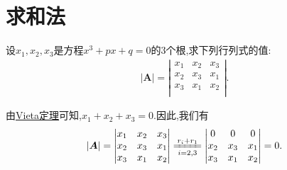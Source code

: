 \documentclass[../../main.tex]{subfiles}%
\begin{document}
\section{求和法}

\begin{example}
设$x_1,x_2,x_3$是方程$x^3+px+q=0$的3个根,求下列行列式的值:
\begin{gather}
\left| \boldsymbol{A} \right|=\left| \begin{matrix}
x_1&		x_2&		x_3\\
x_2&		x_3&		x_1\\
x_3&		x_1&		x_2\\
\end{matrix} \right|.
\nonumber
\end{gather}
\end{example}
\begin{solution}
由\hyperref[theorem:Vieta定理]{Vieta定理}可知,$x_1+x_2+x_3=0$.因此,我们有
\begin{equation}
\begin{split}
\left| \boldsymbol{A} \right|=\left| \begin{matrix}
x_1&		x_2&		x_3\\
x_2&		x_3&		x_1\\
x_3&		x_1&		x_2\\
\end{matrix} \right|\xlongequal[i=2,3]{r_i+r_1}\left| \begin{matrix}
0&		0&		0\\
x_2&		x_3&		x_1\\
x_3&		x_1&		x_2\\
\end{matrix} \right|=0.
\end{split}
\nonumber
\end{equation}

\end{solution}
\end{document}
